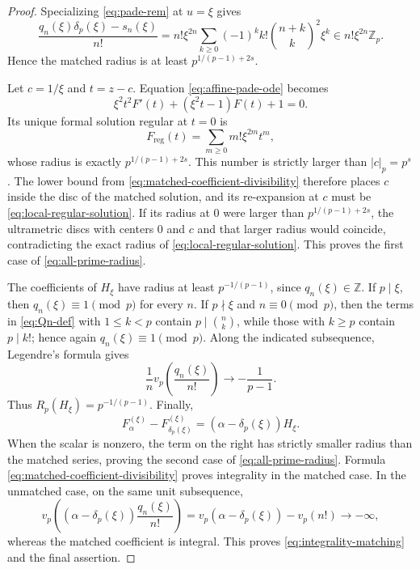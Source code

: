 \begin{proof}
Specializing \eqref{eq:pade-rem} at $u=\xi$ gives
\begin{equation}
 \frac{q_n(\xi)\delta_p(\xi)-s_n(\xi)}{n!}
 =n!\xi^{2n}\sum_{k\geq0}(-1)^k k!
          \binom{n+k}{k}^2\xi^k
 \in n!\xi^{2n}\mathbb Z_p.
\label{eq:matched-coefficient-divisibility}
\end{equation}
Hence the matched radius is at least
$p^{1/(p-1)+2s}$.

Let $c=1/\xi$ and $t=z-c$.  Equation
\eqref{eq:affine-pade-ode} becomes
\begin{equation}
 \xi^2t^2F'(t)+(\xi^2t-1)F(t)+1=0.
\label{eq:local-affine-ode}
\end{equation}
Its unique formal solution regular at $t=0$ is
\begin{equation}
 F_{\mathrm{reg}}(t)=\sum_{m\geq0}m!\xi^{2m}t^m,
\label{eq:local-regular-solution}
\end{equation}
whose radius is exactly $p^{1/(p-1)+2s}$.  This number is strictly larger
than $|c|_p=p^s$.  The lower bound from
\eqref{eq:matched-coefficient-divisibility} therefore places $c$ inside the
disc of the matched solution, and its re-expansion at $c$ must be
\eqref{eq:local-regular-solution}.  If its radius at $0$ were larger than
$p^{1/(p-1)+2s}$, the ultrametric discs with centers $0$ and $c$ and that
larger radius would coincide, contradicting the exact radius of
\eqref{eq:local-regular-solution}.  This proves the first case of
\eqref{eq:all-prime-radius}.

The coefficients of $H_\xi$ have radius at least $p^{-1/(p-1)}$, since
$q_n(\xi)\in\mathbb Z$.  If $p\mid\xi$, then
$q_n(\xi)\equiv1\pmod p$ for every $n$.  If $p\nmid\xi$ and
$n\equiv0\pmod p$, then the terms in \eqref{eq:Qn-def} with
$1\leq k<p$ contain $p\mid\binom nk$, while those with $k\geq p$ contain
$p\mid k!$; hence again $q_n(\xi)\equiv1\pmod p$.  Along the indicated
subsequence, Legendre's formula gives
\[
 \frac1n v_p\!\left(\frac{q_n(\xi)}{n!}\right)
 \longrightarrow-\frac1{p-1}.
\]
Thus $R_p(H_\xi)=p^{-1/(p-1)}$.  Finally,
\[
 F_\alpha^{(\xi)}-F_{\delta_p(\xi)}^{(\xi)}
   =(\alpha-\delta_p(\xi))H_\xi.
\]
When the scalar is nonzero, the term on the right has strictly smaller
radius than the matched series, proving the second case of
\eqref{eq:all-prime-radius}.  Formula
\eqref{eq:matched-coefficient-divisibility} proves integrality in the
matched case.  In the unmatched case, on the same unit subsequence,
\[
 v_p\!\left((\alpha-\delta_p(\xi))\frac{q_n(\xi)}{n!}\right)
 =v_p(\alpha-\delta_p(\xi))-v_p(n!)\longrightarrow-\infty,
\]
whereas the matched coefficient is integral.  This proves
\eqref{eq:integrality-matching} and the final assertion.
\end{proof}

